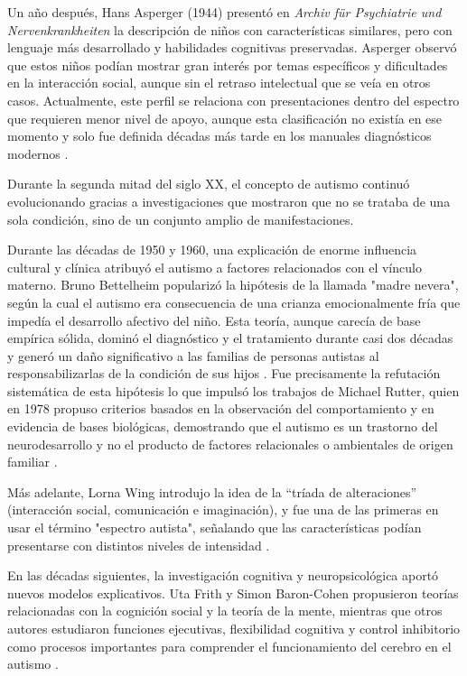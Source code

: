 \documentclass{book}
\begin{document}
Un año después, Hans Asperger (1944) presentó en \textit{Archiv für Psychiatrie und Nervenkrankheiten} la descripción de niños con características similares, pero con lenguaje más desarrollado y habilidades cognitivas preservadas. Asperger observó que estos niños podían mostrar gran interés por temas específicos y dificultades en la interacción social, aunque sin el retraso intelectual que se veía en otros casos. Actualmente, este perfil se relaciona con presentaciones dentro del espectro que requieren menor nivel de apoyo, aunque esta clasificación no existía en ese momento y solo fue definida décadas más tarde en los manuales diagnósticos modernos \cite{asperger1944autistic}.

Durante la segunda mitad del siglo XX, el concepto de autismo continuó evolucionando gracias a investigaciones que mostraron que no se trataba de una sola condición, sino de un conjunto amplio de manifestaciones. 


Durante las décadas de 1950 y 1960, una explicación de enorme 
influencia cultural y clínica atribuyó el autismo a factores 
relacionados con el vínculo materno. Bruno Bettelheim popularizó 
la hipótesis de la llamada "madre nevera", según la cual el 
autismo era consecuencia de una crianza emocionalmente fría 
que impedía el desarrollo afectivo del niño. Esta teoría, 
aunque carecía de base empírica sólida, dominó el diagnóstico 
y el tratamiento durante casi dos décadas y generó un daño 
significativo a las familias de personas autistas al 
responsabilizarlas de la condición de sus hijos 
\cite{Bettelheim1967, Happe2020}. Fue precisamente la 
refutación sistemática de esta hipótesis lo que impulsó 
los trabajos de Michael Rutter, quien en 1978 propuso 
criterios basados en la observación del comportamiento 
y en evidencia de bases biológicas, demostrando que el 
autismo es un trastorno del neurodesarrollo y no el 
producto de factores relacionales o ambientales de 
origen familiar \cite{Rutter1978}.


Más adelante, Lorna Wing introdujo la idea de la “tríada de alteraciones” (interacción social, comunicación e imaginación), y fue una de las primeras en usar el término "espectro autista", señalando que las características podían presentarse con distintos niveles de intensidad \cite{Wing1997, Lord2018}.

En las décadas siguientes, la investigación cognitiva y neuropsicológica aportó nuevos modelos explicativos. Uta Frith y Simon Baron-Cohen propusieron teorías relacionadas con la cognición social y la teoría de la mente, mientras que otros autores estudiaron funciones ejecutivas, flexibilidad cognitiva y control inhibitorio como procesos importantes para comprender el funcionamiento del cerebro en el autismo \cite{Frith2003, BaronCohen2000, Hill2004, Diamond2013}.
\end{document}
